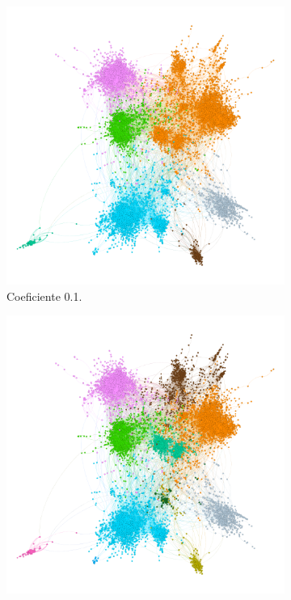\begin{figure}
    \centering  
    \begin{subfigure}[t]{0.48\textwidth}
      \centering
      \includegraphics[width=\textwidth]{img/resultados/grado-leinen0.1.png}
      \caption{Coeficiente 0.1.}
    \end{subfigure}
    \vspace{7mm}
    \hfill
    \begin{subfigure}[t]{0.48\textwidth}
      \centering
      \includegraphics[width=\textwidth]{img/resultados/grado-leinen0.25.png}

\end{subfigure}
\end{figure}
